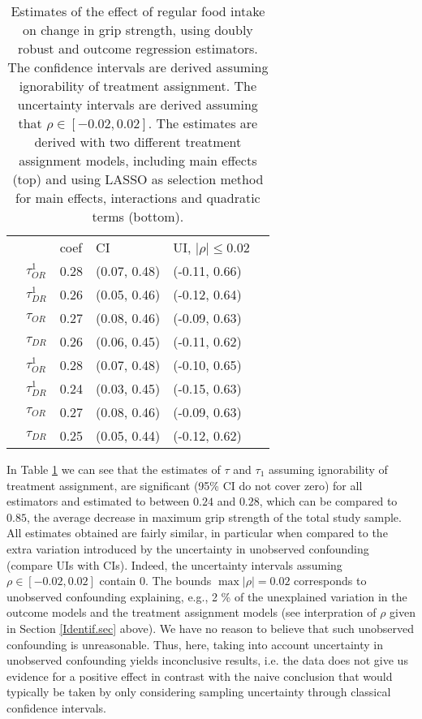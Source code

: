 \documentclass[11pt]{article}
\newcommand*\rot{\rotatebox{90}}
\begin{document}
\begin{table}[ht]
\centering
\caption{Estimates of the effect of regular food intake on change in grip strength, using doubly robust and outcome regression estimators. The confidence intervals are derived assuming ignorability of treatment assignment. The uncertainty intervals are derived assuming that $\rho \in [-0.02, 0.02]$. The estimates are derived with two different treatment assignment models, including main effects (top) and using LASSO as selection method for main effects, interactions and quadratic terms (bottom).}
\begin{tabular}{clllll}
 && coef & CI&UI, $|\rho|\leq0.02$ \\ 
  \cline{2-5}
\multirow{5}{*}{\rot{Main effects}}&$\tau_{OR}^1$ & 0.28 & (0.07, 0.48)&(-0.11, 0.66)\\ 
&$\tau_{DR}^1$  & 0.26 & (0.05, 0.46)&(-0.12, 0.64)\\ 
&$\tau_{OR}$ & 0.27 & (0.08, 0.46) &(-0.09, 0.63)\\ 
&$\tau_{DR}$ & 0.26 & (0.06, 0.45)&(-0.11, 0.62)\\ 
\multirow{4}{*}{\rot{LASSO}}&$\tau_{OR}^1$ & 0.28 & (0.07, 0.48)&(-0.10, 0.65)\\ 
&$\tau_{DR}^1$  & 0.24 & (0.03, 0.45)&(-0.15, 0.63)\\ 
&$\tau_{OR}$ & 0.27 & (0.08, 0.46) &(-0.09, 0.63) \\ 
&$\tau_{DR}$ & 0.25 & (0.05, 0.44)&(-0.12, 0.62)\\ 
  \cline{2-5}
\end{tabular}
\label{ex.tab}
\end{table}

In Table \ref{ex.tab} we can see that the estimates of $\tau$ and $\tau_1$ assuming ignorability of treatment assignment, are significant (95\% CI do not cover zero) for all estimators and estimated to between $0.24$ and $0.28$, which can be compared to $0.85$, the average decrease in maximum grip strength of the total study sample. All estimates obtained are fairly similar, in particular when compared to the extra variation introduced by the uncertainty in unobserved confounding (compare UIs with CIs). Indeed, the uncertainty intervals assuming $\rho \in [-0.02, 0.02]$ contain 0. The bounds $\max|\rho|=0.02$ corresponds to unobserved confounding explaining, e.g., 2 \% of the unexplained variation in the outcome models and the treatment assignment models (see interpration of $\rho$ given in Section \ref{Identif.sec} above). We have no reason to believe that such unobserved confounding is unreasonable. Thus, here, taking into account uncertainty in unobserved confounding yields inconclusive results, i.e. the data does not give us evidence for a positive effect in contrast with the naive conclusion that would typically be taken by only considering sampling uncertainty through classical confidence intervals. 
\end{document}
